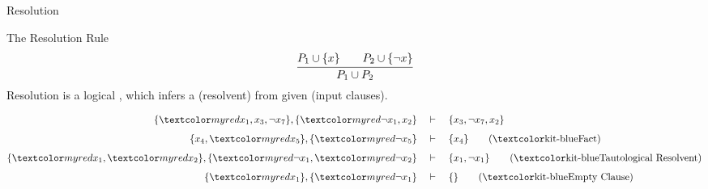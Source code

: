 \documentclass[t]{sdqbeamer}
\begin{document}
\begin{frame}{Resolution}
	\begin{block}{The Resolution Rule}
		\vspace*{-3ex}
		\begin{align*}
			\cfrac{P_1 \cup \{x\}\quad\quad P_2 \cup \{\lnot x\}}{P_1 \cup P_2}
		\end{align*}
		Resolution is a logical , which infers a  (resolvent) from given  (input clauses).
	\end{block}
	
	\pause
	\begin{example}[Resolution]
		\centering
		\begin{minipage}{0.95\textwidth}
			\begin{align*}
			\{ \highlo{x_1}, x_3, \lnot {x_7} \}, \{ \highlo{\lnot {x_1}}, x_2 \} \quad &\vdash \quad \{ x_3, \lnot {x_7}, x_2 \} \\[1ex]
			\{ x_4, \highlo{x_5} \}, \{ \highlo{\lnot {x_5}} \} \quad &\vdash \quad \{ x_4 \} \tag{\highl{Fact}}\\[1ex]
				\{ \highlo{x_1}, \highlo{x_2} \}, \{ \highlo{\lnot {x_1}, \highlo{\lnot {x_2}}} \} \quad &\vdash \quad \{ x_1, \lnot {x_1} \} \tag{\highl{Tautological Resolvent}} \\[1ex]
				\{ \highlo{x_1} \}, \{ \highlo{\lnot {x_1}} \} \quad &\vdash \quad \{ \} \tag{\highl{Empty Clause}}
			\end{align*}
		\end{minipage}
	\end{example}
\end{frame}
\end{document}
